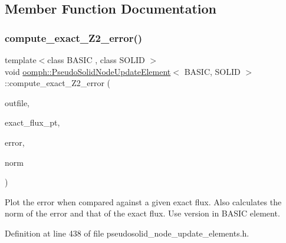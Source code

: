 \subsection{Member Function Documentation}
\mbox{\label{classoomph_1_1PseudoSolidNodeUpdateElement_a1b1baac59b7500a04f06e9ac5bc534b0}} 
\subsubsection{\texorpdfstring{compute\+\_\+exact\+\_\+\+Z2\+\_\+error()}{compute\_exact\_Z2\_error()}}
{\footnotesize\ttfamily template$<$class B\+A\+S\+IC , class S\+O\+L\+ID $>$ \\
void \hyperlink{classoomph_1_1PseudoSolidNodeUpdateElement}{oomph\+::\+Pseudo\+Solid\+Node\+Update\+Element}$<$ B\+A\+S\+IC, S\+O\+L\+ID $>$\+::compute\+\_\+exact\+\_\+\+Z2\+\_\+error (\begin{DoxyParamCaption}\item[{std\+::ostream \&}]{outfile,  }\item[{\hyperlink{classoomph_1_1FiniteElement_a690fd33af26cc3e84f39bba6d5a85202}{Finite\+Element\+::\+Steady\+Exact\+Solution\+Fct\+Pt}}]{exact\+\_\+flux\+\_\+pt,  }\item[{double \&}]{error,  }\item[{double \&}]{norm }\end{DoxyParamCaption})\hspace{0.3cm}{\ttfamily [inline]}}



Plot the error when compared against a given exact flux. Also calculates the norm of the error and that of the exact flux. Use version in B\+A\+S\+IC element. 



Definition at line 438 of file pseudosolid\+\_\+node\+\_\+update\+\_\+elements.\+h.

\mbox{\label{classoomph_1_1PseudoSolidNodeUpdateElement_a4db0954b3a48a6b1bb6df7a34d86b0e8}} 

